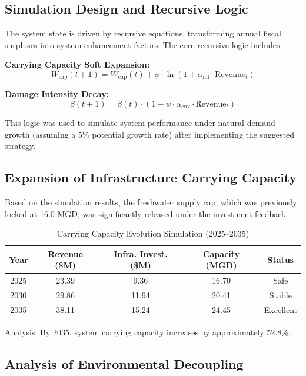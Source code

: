 \documentclass{mcmthesis}
\begin{document}
\subsection{Simulation Design and Recursive Logic}
The system state is driven by recursive equations, transforming annual fiscal surpluses into system enhancement factors. The core recursive logic includes:

\textbf{Carrying Capacity Soft Expansion:}
\begin{equation}
W_{\text{cap}}(t+1) = W_{\text{cap}}(t) + \phi \cdot \ln(1 + \alpha_{\text{inf}} \cdot \text{Revenue}_t)
\end{equation}

\textbf{Damage Intensity Decay:}
\begin{equation}
\beta(t+1) = \beta(t) \cdot (1-\psi \cdot \alpha_{\text{env}} \cdot \text{Revenue}_t)
\end{equation}

This logic was used to simulate system performance under natural demand growth (assuming a 5\% potential growth rate) after implementing the suggested strategy.

\subsection{Expansion of Infrastructure Carrying Capacity}
Based on the simulation results, the freshwater supply cap, which was previously locked at 16.0 MGD, was significantly released under the investment feedback.

\begin{table}[H]
\centering
\caption{Carrying Capacity Evolution Simulation (2025--2035)}
\begin{tabular}{c|c|c|c|c}
\toprule
Year & Revenue (\$M) & Infra. Invest. (\$M) & Capacity (MGD) & Status \\
\midrule
2025 & 23.39 & 9.36 & 16.70 & Safe \\
2030 & 29.86 & 11.94 & 20.41 & Stable \\
2035 & 38.11 & 15.24 & 24.45 & Excellent \\
\bottomrule
\end{tabular}
\end{table}

Analysis: By 2035, system carrying capacity increases by approximately 52.8\%.

\subsection{Analysis of Environmental Decoupling}
\end{document}
